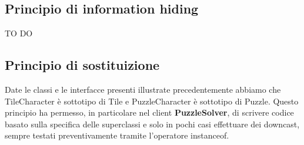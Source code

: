 	\subsection{Principio di information hiding}
TO DO

	\subsection{Principio di sostituizione}
Date le classi e le interfacce presenti illustrate precedentemente abbiamo che TileCharacter è sottotipo di Tile e PuzzleCharacter è sottotipo di Puzzle. Questo principio ha permesso, in particolare nel client \textbf{PuzzleSolver}, di scrivere codice basato sulla specifica delle superclassi e solo in pochi casi effettuare dei downcast, sempre testati preventivamente tramite l'operatore instanceof.
